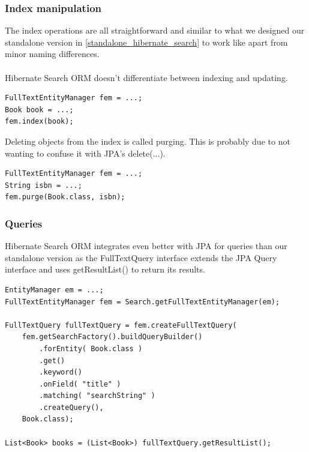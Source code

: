 \pagebreak

\subsubsection{Index manipulation}
The index operations are all straightforward and similar to what we designed our standalone version in \ref{standalone_hibernate_search} to work like apart from minor naming differences. 
\\\\
Hibernate Search ORM doesn't differentiate between indexing and updating.
\\
\lstset{language=java}
\begin{lstlisting}[frame=htrbl, caption={Indexing/Updating an object with Hibernate Search ORM}, label={lst:indexing_object_hsearch_orm_jpa.java}]
FullTextEntityManager fem = ...;
Book book = ...;
fem.index(book);
\end{lstlisting}
\noindent
Deleting objects from the index is called purging. This is probably due to not wanting to confuse it with JPA's delete(...).
\\
\lstset{language=java}
\begin{lstlisting}[frame=htrbl, caption={Deleting an object by id with Hibernate Search ORM}, label={lst:deleting_object_hsearch_orm_jpa.java}]
FullTextEntityManager fem = ...;
String isbn = ...;
fem.purge(Book.class, isbn);
\end{lstlisting}

\pagebreak

\subsubsection{Queries} \label{hsearch_orm_querying}
Hibernate Search ORM integrates even better with JPA for queries than our standalone version as the FullTextQuery interface extends the JPA Query interface and uses getResultList() to return its results.
\\
\lstset{language=java}
\begin{lstlisting}[frame=htrbl, caption={Querying with Hibernate Search ORM}, label={lst:querying_hsearch_orm.java_1}]
EntityManager em = ...;
FullTextEntityManager fem = Search.getFullTextEntityManager(em);

FullTextQuery fullTextQuery = fem.createFullTextQuery(
	fem.getSearchFactory().buildQueryBuilder()
		.forEntity( Book.class )
		.get()
		.keyword()
		.onField( "title" )
		.matching( "searchString" )
		.createQuery(), 
	Book.class);
	
List<Book> books = (List<Book>) fullTextQuery.getResultList();
\end{lstlisting}

